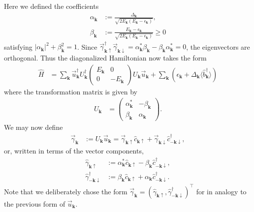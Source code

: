 \documentclass[english, parskip=full]{scrartcl}
\newcommand{\kla}{}
\begin{document}
Here we defined the coefficients
\begin{align}
\alpha_{\mathbf{k}} &:= \frac{\Delta_{\mathbf{k}}}{\sqrt{2E_{\mathbf{k}} ( E_{\mathbf{k}} - \epsilon_{\mathbf{k}})}},\\
\beta_{\mathbf{k}} &:= \frac{E_{\mathbf{k}} - \epsilon_{\mathbf{k}}}{\sqrt{2E_{\mathbf{k}} ( E_{\mathbf{k}} - \epsilon_{\mathbf{k}})}} \ge 0
\end{align}
satisfying $|\alpha_\textbf{k}|^2 + \beta_\textbf{k}^2 = 1$.
Since $\vec{\gamma}_{\mathbf{k}\uparrow}^\dagger \vec{\gamma}_{\mathbf{k}\downarrow} = \alpha_{\mathbf{k}}^\ast \beta_\textbf{k} - \beta_\textbf{k} \alpha_\textbf{k}^\ast = 0$, the eigenvectors are orthogonal.
Thus the diagonalized Hamiltonian now takes the form
\begin{align}
\hat{H} &= \sum_{\mathbf{k}} \vec{u}_{\mathbf{k}}^\dagger  U_{\mathbf{k}}^\dagger \begin{pmatrix}
E_{\mathbf{k}} & 0 \\
0 & -E_{\mathbf{k}}
\end{pmatrix} U_{\mathbf{k}} \vec{u}_{\mathbf{k}} + \sum_{\textbf{k}}\kla\left(  \epsilon_\textbf{k} + \Delta_\textbf{k} \langle \hat{b}_{\mathbf{k}}^\dagger \rangle \right)
\end{align}
where the transformation matrix is given by
\begin{align}
U_{\mathbf{k}} &= \begin{pmatrix}
\alpha_\textbf{k}^\ast & -\beta_\textbf{k} \\ \beta_\textbf{k} & \alpha_\textbf{k}
\end{pmatrix}.
\end{align}
We may now define
\begin{align}
\vec{\gamma}_{\mathbf{k}} &:= U_{\mathbf{k}}\vec{u}_{\mathbf{k}} = \vec{\gamma}_{\mathbf{k}\uparrow} \hat{c}_{\mathbf{k}\uparrow} + \vec{\gamma}_{\mathbf{k}\downarrow} \hat{c}_{-\mathbf{k}\downarrow}^\dagger,
\end{align}
or, written in terms of the vector components, 
\begin{align}
\hat{\gamma}_{\mathbf{k}\uparrow} &:=  \alpha^\ast_{\mathbf{k}}\hat{c}_{\mathbf{k}\uparrow} -\beta_\textbf{k} \hat{c}_{-\mathbf{k}\downarrow}^\dagger,\\
\hat{\gamma}_{-\mathbf{k}\downarrow}^\dagger &:=  \beta_\textbf{k} \hat{c}_{\mathbf{k}\uparrow} + \alpha_\textbf{k} \hat{c}_{-\mathbf{k}\downarrow}^\dagger.
\end{align}
Note that we deliberately chose the form $\vec{\gamma}_{\mathbf{k}} = (\hat{\gamma}_{\mathbf{k}\uparrow}, \hat{\gamma}_{-\mathbf{k}\downarrow}^\dagger)^\top$ for in analogy to the previous form of $\vec{u}_{\mathbf{k}}$.
\end{document}
